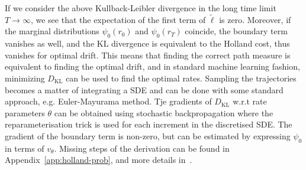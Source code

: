 If we consider the above Kullback-Leibler divergence in the long time limit $T \rightarrow \infty$, we see that the expectation of the first term of $\tilde{\ell}$ is zero. Moreover, if the marginal distributions $\psi_{0}(r_0)$ and $\psi_{0}(r_T)$ coincide, the boundary term vanishes as well, and the KL divergence is equivalent to the Holland cost, thus vanishes for optimal drift. This means that finding the correct path measure is equivalent to finding the optimal drift, and in standard machine learning fashion, minimizing $D_{\mathrm{KL}}$ can be used to find the optimal rates. Sampling the trajectories becomes a matter of integrating a SDE and can be done with some standard approach, e.g. Euler-Mayurama method. Tje gradients of $D_{\mathrm{KL}}$ w.r.t rate parameters $\theta$ can be obtained using stochastic backpropagation where the reparameterisation trick is used for each increment in the discretised SDE. The gradient of the boundary term is non-zero, but can be estimated by expressing $\psi_0$ in terms of $v_{\theta}$. Missing steps of the derivation can be found in Appendix~\ref{app:holland-prob}, and more details in~\cite{barr2020quantum}. 

